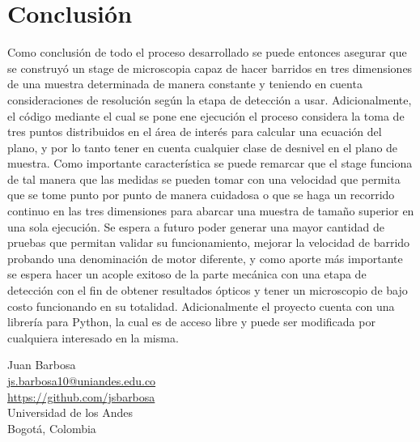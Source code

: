 \chapter{Conclusión}\label{ch:conclusion}
Como conclusión de todo el proceso desarrollado se puede entonces asegurar que se construyó un stage de microscopia capaz de hacer barridos en tres dimensiones de una muestra determinada de manera constante y teniendo en cuenta consideraciones de resolución según la etapa de detección a usar. Adicionalmente, el código mediante el cual se pone ene ejecución el proceso considera la toma de tres puntos distribuidos en el área de interés para calcular una ecuación del plano, y por lo tanto tener en cuenta cualquier clase de desnivel en el plano de muestra. Como importante característica se puede remarcar que el stage funciona de tal manera que las medidas se pueden tomar con una velocidad que permita que se tome punto por punto de manera cuidadosa o que se haga un recorrido continuo en las tres dimensiones para abarcar una muestra de tamaño superior en una sola ejecución. Se espera a futuro poder generar una mayor cantidad de pruebas que permitan validar su funcionamiento, mejorar la velocidad de barrido probando una denominación de motor diferente, y como aporte más importante se espera hacer un acople exitoso de la parte mecánica con una etapa de detección con el fin de obtener resultados ópticos y tener un microscopio de bajo costo funcionando en su totalidad. Adicionalmente el proyecto cuenta con una librería para Python, la cual es de acceso libre y puede ser modificada por cualquiera interesado en la misma. 
  \begin{center}
    Juan Barbosa \\
    \href{mailto: js.barbosa10@uniandes.edu.co}{js.barbosa10@uniandes.edu.co}\\
    \href{https://github.com/jsbarbosa}{https://github.com/jsbarbosa}\\
    Universidad de los Andes\\
	Bogotá, Colombia
  \end{center}